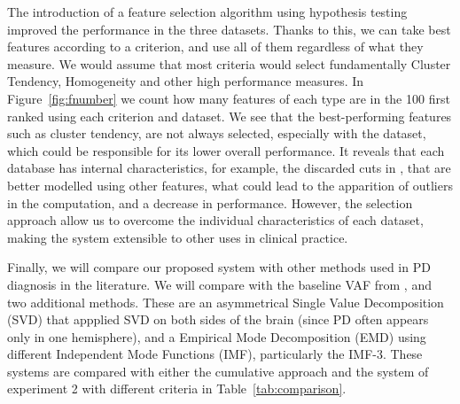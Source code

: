 The introduction of a feature selection algorithm using hypothesis testing improved the performance in the three datasets. Thanks to this, we can take best features according to a criterion, and use all of them regardless of what they measure. We would assume that most criteria would select fundamentally Cluster Tendency, Homogeneity and other high performance measures. In Figure~\ref{fig:fnumber} we count how many features of each type are in the 100 first ranked using each criterion and dataset. We see that the best-performing features such as cluster tendency, are not always selected, especially with the \vdlvdat{}{} dataset, which could be responsible for its lower overall performance. It reveals that each database has internal characteristics, for example, the discarded cuts in \vdlvdat{}{}, that are better modelled using other features, what could lead to the apparition of outliers in the computation, and a decrease in performance. However, the selection approach allow us to overcome the individual characteristics of each dataset, making the system extensible to other uses in clinical practice. 

Finally, we will compare our proposed system with other methods used in \ac{PD} diagnosis in the literature. We will compare with the baseline \ac{VAF} from \cite{Illan2012}, and two additional methods. These are an asymmetrical Single Value Decomposition (SVD) \cite{Segovia2012} that appplied SVD on both sides of the brain (since PD often appears only in one hemisphere), and a Empirical Mode Decomposition (EMD)  \cite{Rojas2012} using different Independent Mode Functions (IMF), particularly the IMF-3. These systems are compared with either the cumulative approach and the system of experiment 2 with different criteria in Table~\ref{tab:comparison}.

